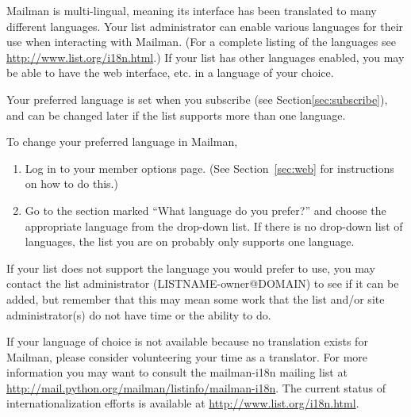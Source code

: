 \documentclass{howto}
\begin{document}
Mailman is  multi-lingual, meaning its interface has been translated to many
different languages.  Your list administrator can enable various languages for
their use when interacting with Mailman. 
(For a complete listing of the languages see
\url{http://www.list.org/i18n.html}.)  If your list has other languages
enabled, you may be able to have the web interface, etc. in a language of your
choice.  


Your preferred language is set when you subscribe (see 
Section\ref{sec:subscribe}), and can be changed later if the list supports
more than one language.  

To change your preferred language in Mailman,
\begin{enumerate}
	\item Log in to your member options page.  (See Section~\ref{sec:web} for 
   instructions on how to do this.)
	\item Go to the section marked ``What language do you prefer?'' and choose
	the appropriate language from the drop-down list.  If there is no
	drop-down list of languages, the list you are on probably only supports
	one language.  
\end{enumerate}

If your list does not support the language you would prefer to use, you may
contact the list administrator (LISTNAME-owner@DOMAIN) to see if it can be 
added, but remember that this may mean some work that the list and/or site 
administrator(s) do not have time or the ability to do.  

If your language of choice is not available because no translation
exists for Mailman, please consider volunteering your time as a translator.
For more information you may want to consult the mailman-i18n mailing 
list at \url{http://mail.python.org/mailman/listinfo/mailman-i18n}.  The
current status of internationalization efforts is available at
\url{http://www.list.org/i18n.html}.


\end{document}
